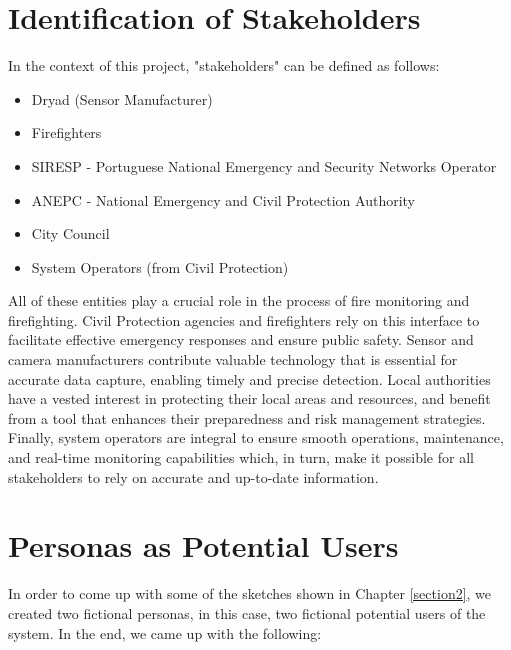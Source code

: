\section{Identification of Stakeholders}
In the context of this project, "stakeholders" can be defined as follows:
\begin{itemize}
    \item Dryad (Sensor Manufacturer)
    \item Firefighters
    \item SIRESP - Portuguese National Emergency 
    and Security Networks Operator 
    \item ANEPC - National Emergency and Civil Protection Authority
    \item City Council
    \item System Operators (from Civil Protection)
\end{itemize} \par 
All of these entities play a crucial role in the process of fire monitoring and firefighting. 
Civil Protection agencies and firefighters rely on this 
interface to facilitate effective emergency responses and 
ensure public safety. Sensor and camera manufacturers contribute 
valuable technology that is essential for accurate data capture, 
enabling timely and precise detection. Local authorities have 
a vested interest in protecting their local areas and resources, 
and benefit from a tool that enhances their preparedness and 
risk management strategies. Finally, system operators are integral 
to ensure smooth operations, maintenance, and real-time monitoring 
capabilities which, in turn, make it possible for all stakeholders 
to rely on accurate and up-to-date information. 
\section{Personas as Potential Users}
In order to come up with some of the sketches shown in Chapter \ref{section2},
we created two fictional personas, in this case, two 
fictional potential users of the system. In the end, we came up 
with the following:
 \\

